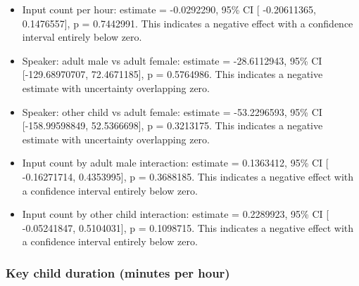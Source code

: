 \documentclass[
  letterpaper,
  DIV=11,
  numbers=noendperiod]{scrartcl}
\providecommand{\tightlist}{%
  \setlength{\itemsep}{0pt}\setlength{\parskip}{0pt}}\usepackage{longtable,booktabs,array}
\begin{document}
\begin{itemize}
\tightlist
\item
  Input count per hour: estimate = -0.0292290, 95\% CI {[} -0.20611365,
  0.1476557{]}, p = 0.7442991. This indicates a negative effect with a
  confidence interval entirely below zero.
\item
  Speaker: adult male vs adult female: estimate = -28.6112943, 95\% CI
  {[}-129.68970707, 72.4671185{]}, p = 0.5764986. This indicates a
  negative estimate with uncertainty overlapping zero.
\item
  Speaker: other child vs adult female: estimate = -53.2296593, 95\% CI
  {[}-158.99598849, 52.5366698{]}, p = 0.3213175. This indicates a
  negative estimate with uncertainty overlapping zero.
\item
  Input count by adult male interaction: estimate = 0.1363412, 95\% CI
  {[} -0.16271714, 0.4353995{]}, p = 0.3688185. This indicates a
  negative effect with a confidence interval entirely below zero.
\item
  Input count by other child interaction: estimate = 0.2289923, 95\% CI
  {[} -0.05241847, 0.5104031{]}, p = 0.1098715. This indicates a
  negative effect with a confidence interval entirely below zero.
\end{itemize}

\hypertarget{key-child-duration-minutes-per-hour}{%
\subsubsection{Key child duration (minutes per
hour)}\label{key-child-duration-minutes-per-hour}}
\end{document}
